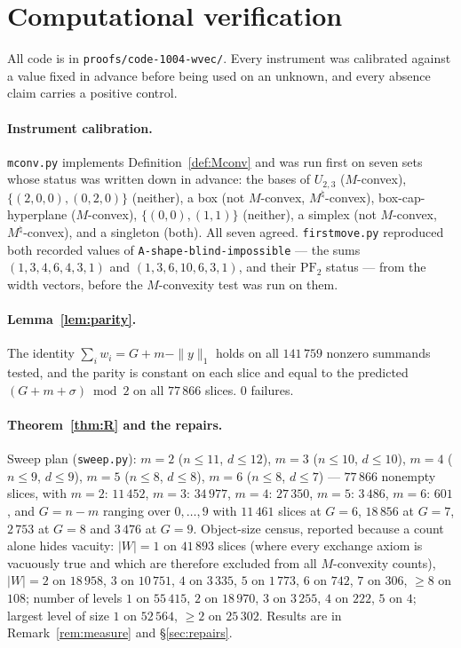 \documentclass[11pt]{article}
\theoremstyle{plain}
\theoremstyle{definition}
\newcommand{\PFtwo}{\mathrm{PF}_2}
\begin{document}
\section{Computational verification}\label{sec:verif}

All code is in \texttt{proofs/code-1004-wvec/}. Every instrument was calibrated against a
value fixed in advance before being used on an unknown, and every absence claim carries a
positive control.

\paragraph{Instrument calibration.} \texttt{mconv.py} implements
Definition~\ref{def:Mconv} and was run first on seven sets whose status was written down
in advance: the bases of $U_{2,3}$ ($M$-convex), $\{(2,0,0),(0,2,0)\}$ (neither),
a box (not $M$-convex, $M^\natural$-convex), box-cap-hyperplane ($M$-convex),
$\{(0,0),(1,1)\}$ (neither), a simplex (not $M$-convex, $M^\natural$-convex), and a
singleton (both). All seven agreed. \texttt{firstmove.py} reproduced both recorded values
of \texttt{A-shape-blind-impossible} --- the sums $(1,3,4,6,4,3,1)$ and
$(1,3,6,10,6,3,1)$, and their $\PFtwo$ status --- from the width vectors, before the
$M$-convexity test was run on them.

\paragraph{Lemma~\ref{lem:parity}.} The identity $\sum_i w_i=G+m-\|y\|_1$ holds on all
$141\,759$ nonzero summands tested, and the parity is constant on each slice and equal to
the predicted $(G+m+\sigma)\bmod 2$ on all $77\,866$ slices. $0$ failures.

\paragraph{Theorem~\ref{thm:R} and the repairs.} Sweep plan (\texttt{sweep.py}):
$m=2$ ($n\le11$, $d\le12$), $m=3$ ($n\le10$, $d\le10$), $m=4$ ($n\le9$, $d\le9$),
$m=5$ ($n\le8$, $d\le8$), $m=6$ ($n\le8$, $d\le7$) --- $77\,866$ nonempty slices, with
$m=2$: $11\,452$, $m=3$: $34\,977$, $m=4$: $27\,350$, $m=5$: $3\,486$, $m=6$: $601$, and
$G=n-m$ ranging over $0,\dots,9$ with $11\,461$ slices at $G=6$, $18\,856$ at $G=7$,
$2\,753$ at $G=8$ and $3\,476$ at $G=9$. Object-size census, reported because a count
alone hides vacuity: $|W|=1$ on $41\,893$ slices (where every exchange axiom is
vacuously true and which are therefore excluded from all $M$-convexity counts), $|W|=2$
on $18\,958$, $3$ on $10\,751$, $4$ on $3\,335$, $5$ on $1\,773$, $6$ on $742$, $7$ on
$306$, $\ge8$ on $108$; number of levels $1$ on $55\,415$, $2$ on $18\,970$, $3$ on
$3\,255$, $4$ on $222$, $5$ on $4$; largest level of size $1$ on $52\,564$, $\ge2$ on
$25\,302$. Results are in Remark~\ref{rem:measure} and \S\ref{sec:repairs}.
\end{document}
